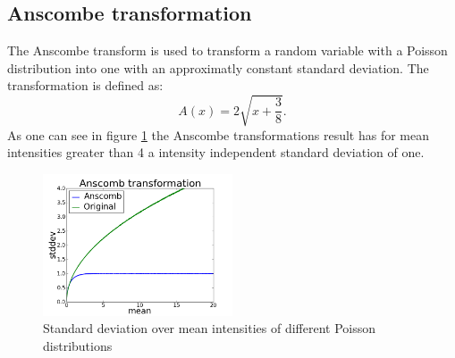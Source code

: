\subsection{Anscombe transformation}
\label{trafoAnscombe}
The Anscombe transform is used to transform a random variable with a Poisson
distribution into one with an approximatly constant standard deviation. The
transformation is defined as:
\begin{equation}
	A(x) = 2\sqrt{x+\frac{3}{8}}.
\end{equation}
As one can see in figure \ref{anscombe} the Anscombe transformations result has
for mean intensities greater than 4 a intensity independent standard deviation of
one.
\begin{figure}
	\centering
	\includegraphics[width = 0.5\textwidth]{pictures/anscombe.png}
	\caption{Standard deviation over mean intensities of different Poisson
	distributions}
	\label{anscombe}
	
\end{figure}

